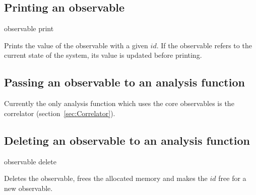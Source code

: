 \subsection{Printing an observable}
\begin{essyntax}
observable  print 
\end{essyntax}
Prints the value of the observable with a given $id$. If the observable
refers to the current state of the system, its value is updated before printing.

\subsection{Passing an observable to an analysis function}
Currently the only analysis function which uses the core observables
is the correlator (section~\ref{sec:Correlator}).

\subsection{Deleting an observable to an analysis function}
\begin{essyntax}
observable  delete
\end{essyntax}
Deletes the observable, \ie frees the allocated memory
and makes the $id$ free for a new observable.


